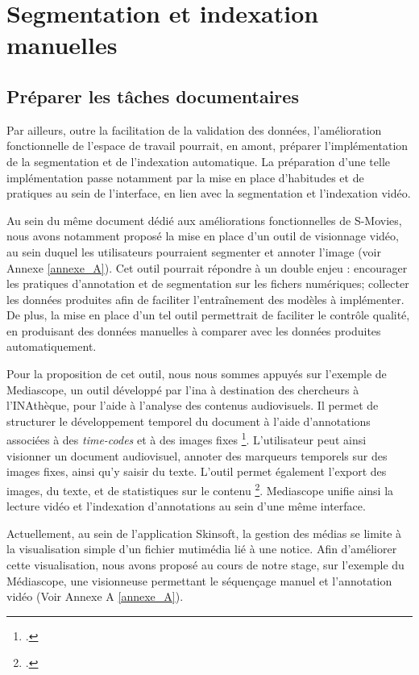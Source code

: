 \section{\label{III_2_B}Segmentation et indexation manuelles} 

\subsection{Préparer les tâches documentaires}

Par ailleurs, outre la facilitation de la validation des données, l'amélioration fonctionnelle de l'espace de travail pourrait, en amont, préparer l'implémentation de la segmentation et de l'indexation automatique. La préparation d'une telle implémentation passe notamment par la mise en place d'habitudes et de pratiques au sein de l'interface, en lien avec la segmentation et l'indexation vidéo. 

Au sein du même document dédié aux améliorations fonctionnelles de S-Movies, nous avons notamment proposé la mise en place d'un outil de visionnage vidéo, au sein duquel les utilisateurs pourraient segmenter et annoter l'image (voir Annexe \ref{annexe_A}). Cet outil pourrait répondre à un double enjeu : encourager les pratiques d'annotation et de segmentation sur les fichers numériques; collecter les données produites afin de faciliter l'entraînement des modèles à implémenter. De plus, la mise en place d'un tel outil permettrait de faciliter le contrôle qualité, en produisant des données manuelles à comparer avec les données produites automatiquement. 

Pour la proposition de cet outil, nous nous sommes appuyés sur l'exemple de Mediascope, un outil développé par l'\gls{ina} à destination des chercheurs à l'INAthèque, pour l'aide à l'analyse des contenus audiovisuels. Il permet de structurer le développement temporel du document à l'aide d'annotations associées à des \textit{time-codes} et à des images fixes \footcite{zotero-item-746}. L'utilisateur peut ainsi visionner un document audiovisuel, annoter des marqueurs temporels sur des images fixes, ainsi qu'y saisir du texte. L'outil permet également l'export des images, du texte, et de statistiques sur le contenu \footcite{zotero-item-746}. Mediascope unifie ainsi la lecture vidéo et l'indexation d'annotations au sein d'une même interface.

Actuellement, au sein de l'application Skinsoft, la gestion des médias se limite à la visualisation simple d'un fichier mutimédia lié à une notice. Afin d'améliorer cette visualisation, nous avons proposé au cours de notre stage, sur l'exemple du Médiascope, une visionneuse permettant le séquençage manuel et l'annotation vidéo (Voir Annexe A \ref{annexe_A}). 

